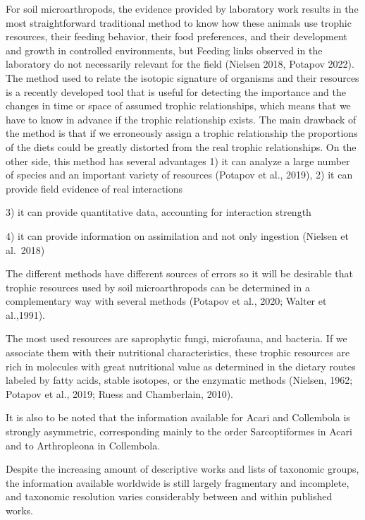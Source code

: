 \documentclass[11pt]{article}
\begin{document}
For soil microarthropods, the evidence provided by laboratory work
results in the most straightforward traditional method to know how these
animals use trophic resources, their feeding behavior, their food
preferences, and their development and growth in controlled
environments, but Feeding links observed in the laboratory do not
necessarily relevant for the field (Nielsen 2018, Potapov 2022). The
method used to relate the isotopic signature of organisms and their
resources is a recently developed tool that is useful for detecting the
importance and the changes in time or space of assumed trophic
relationships, which means that we have to know in advance if the
trophic relationship exists. The main drawback of the method is that if
we erroneously assign a trophic relationship the proportions of the
diets could be greatly distorted from the real trophic relationships. On
the other side, this method has several advantages 1) it can analyze a
large number of species and an important variety of resources (Potapov
et al., 2019), 2) it can provide field evidence of real interactions

3) it can provide quantitative data, accounting for interaction strength

4) it can provide information on assimilation and not only ingestion
(Nielsen et al.~2018)

The different methods have different sources of errors so it will be
desirable that trophic resources used by soil microarthropods can be
determined in a complementary way with several methods (Potapov et al.,
2020; Walter et al.,1991).

The most used resources are saprophytic fungi, microfauna, and bacteria.
If we associate them with their nutritional characteristics, these
trophic resources are rich in molecules with great nutritional value as
determined in the dietary routes labeled by fatty acids, stable
isotopes, or the enzymatic methods (Nielsen, 1962; Potapov et al., 2019;
Ruess and Chamberlain, 2010).

It is also to be noted that the information available for Acari and
Collembola is strongly asymmetric, corresponding mainly to the order
Sarcoptiformes in Acari and to Arthropleona in Collembola.

Despite the increasing amount of descriptive works and lists of
taxonomic groups, the information available worldwide is still largely
fragmentary and incomplete, and taxonomic resolution varies considerably
between and within published works.
\end{document}
